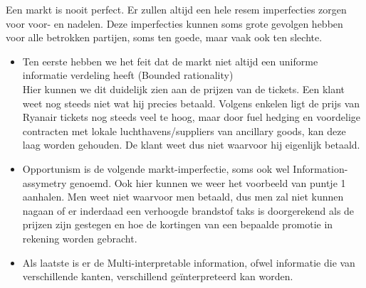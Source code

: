 \documentclass{article}
\begin{document}
Een markt is nooit perfect. Er zullen altijd een hele resem imperfecties zorgen voor voor- en nadelen. Deze imperfecties kunnen soms grote gevolgen hebben voor alle betrokken partijen, soms ten goede, maar vaak ook ten slechte.
\begin{itemize}
\item Ten eerste hebben we het feit dat de markt niet altijd een uniforme informatie verdeling heeft (Bounded rationality) \\
Hier kunnen we dit duidelijk zien aan de prijzen van de tickets. Een klant weet nog steeds niet wat hij precies betaald. Volgens enkelen ligt de prijs van Ryanair tickets nog steeds veel te hoog, maar door fuel hedging en voordelige contracten met lokale luchthavens/suppliers van ancillary goods, kan deze laag worden gehouden. De klant weet dus niet waarvoor hij eigenlijk betaald.

\item Opportunism is de volgende markt-imperfectie, soms ook wel Information-assymetry genoemd. Ook hier kunnen we weer het voorbeeld van puntje 1 aanhalen. Men weet niet waarvoor men betaald, dus men zal niet kunnen nagaan of er inderdaad een verhoogde brandstof taks is doorgerekend als de prijzen zijn gestegen en hoe de kortingen van een bepaalde promotie in rekening worden gebracht.

\item Als laatste is er de Multi-interpretable information, ofwel informatie die van verschillende kanten, verschillend ge\"interpreteerd kan worden.
\end{itemize}
\end{document}
